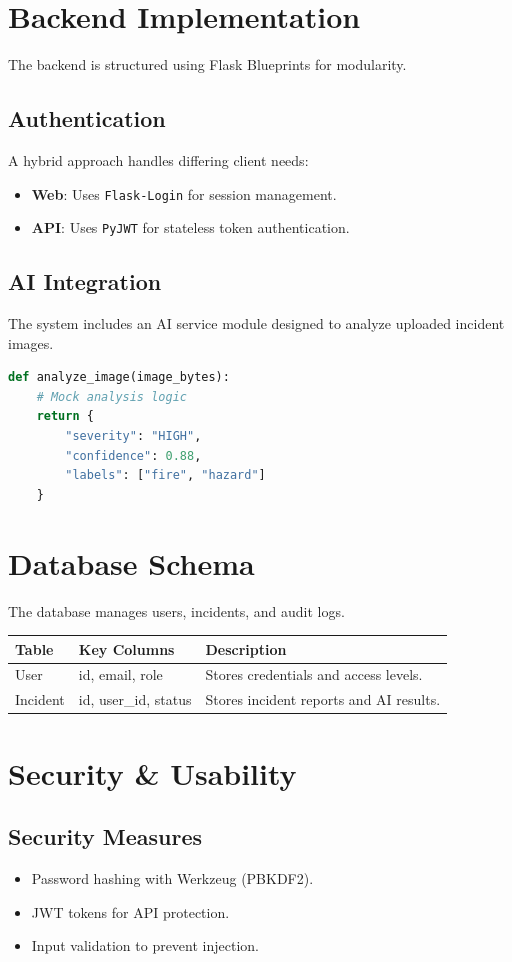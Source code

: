 \documentclass[a4paper,12pt]{article}
\begin{document}
\section{Backend Implementation}
The backend is structured using Flask Blueprints for modularity.

\subsection{Authentication}
A hybrid approach handles differing client needs:
\begin{itemize}
    \item \textbf{Web}: Uses \texttt{Flask-Login} for session management.
    \item \textbf{API}: Uses \texttt{PyJWT} for stateless token authentication.
\end{itemize}

\subsection{AI Integration}
The system includes an AI service module designed to analyze uploaded incident images.
\begin{lstlisting}[language=Python, caption=AI Analysis Logic Stub]
def analyze_image(image_bytes):
    # Mock analysis logic
    return {
        "severity": "HIGH",
        "confidence": 0.88,
        "labels": ["fire", "hazard"]
    }
\end{lstlisting}

\section{Database Schema}
The database manages users, incidents, and audit logs.

\begin{longtable}{|p{3cm}|p{4cm}|p{6cm}|}
\hline
\textbf{Table} & \textbf{Key Columns} & \textbf{Description} \\
\hline
\endhead
User & id, email, role & Stores credentials and access levels. \\
\hline
Incident & id, user\_id, status & Stores incident reports and AI results. \\
\hline
\end{longtable}

\section{Security & Usability}
\subsection{Security Measures}
\begin{itemize}
    \item Password hashing with Werkzeug (PBKDF2).
    \item JWT tokens for API protection.
    \item Input validation to prevent injection.
\end{itemize}
\end{document}
